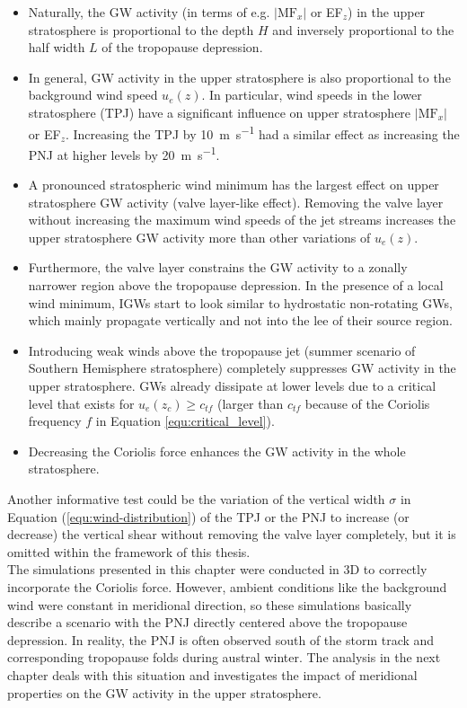 \begin{itemize}
    \item Naturally, the GW activity (in terms of e.g. $\left| \mathrm{MF}_x \right|$ or EF$_z$) in the upper stratosphere is proportional to the depth $H$ and inversely proportional to the half width $L$ of the tropopause depression.
    \item In general, GW activity in the upper stratosphere is also proportional to the background wind speed $u_e(z)$. In particular, wind speeds in the lower stratosphere (TPJ) have a significant influence on upper stratosphere $\left| \mathrm{MF}_x \right|$ or EF$_z$. Increasing the TPJ by \SI{10}{\meter\per\second} had a similar effect as increasing the PNJ at higher levels by \SI{20}{\meter\per\second}.
    \item A pronounced stratospheric wind minimum has the largest effect on upper stratosphere GW activity (valve layer-like effect). Removing the valve layer without increasing the maximum wind speeds of the jet streams increases the upper stratosphere GW activity more than other variations of $u_e(z)$. 
    \item Furthermore, the valve layer constrains the GW activity to a zonally narrower region above the tropopause depression. In the presence of a local wind minimum, IGWs start to look similar to hydrostatic non-rotating GWs, which mainly propagate vertically and not into the lee of their source region.  
    \item Introducing weak winds above the tropopause jet (summer scenario of Southern Hemisphere stratosphere) completely suppresses GW activity in the upper stratosphere. GWs already dissipate at lower levels due to a critical level that exists for $u_e(z_c) \geq c_{tf}$ (larger than $c_{tf}$ because of the Coriolis frequency $f$ in Equation \ref{equ:critical_level}).
    \item Decreasing the Coriolis force enhances the GW activity in the whole stratosphere.
\end{itemize}
Another informative test could be the variation of the vertical width $\sigma$ in Equation (\ref{equ:wind-distribution}) of the TPJ or the PNJ to increase (or decrease) the vertical shear without removing the valve layer completely, but it is omitted within the framework of this thesis. \\
The simulations presented in this chapter were conducted in 3D to correctly incorporate the Coriolis force. However, ambient conditions like the background wind were constant in meridional direction, so these simulations basically describe a scenario with the PNJ directly centered above the tropopause depression. In reality, the PNJ is often observed south of the storm track and corresponding tropopause folds during austral winter. The analysis in the next chapter deals with this situation and investigates the impact of meridional properties on the GW activity in the upper stratosphere.